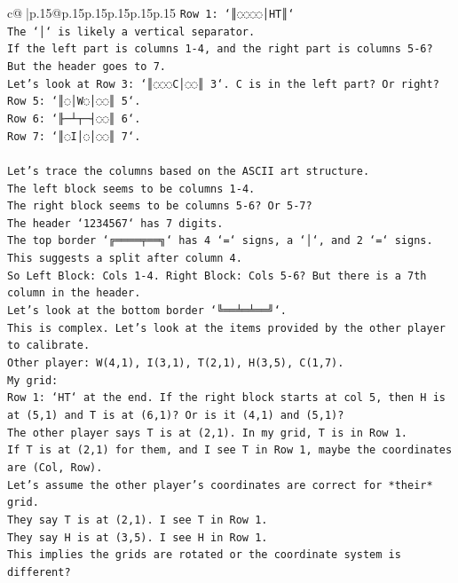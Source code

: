\documentclass{article}
\begin{document}
{\begin{supertabular}{c@{$\;$}|p{.15\linewidth}@{}p{.15\linewidth}p{.15\linewidth}p{.15\linewidth}p{.15\linewidth}p{.15\linewidth}}
{{{\texttt{Row 1: `║◌◌◌◌│HT║`} \\
\texttt{The `│` is likely a vertical separator.} \\
\texttt{If the left part is columns 1{-}4, and the right part is columns 5{-}6?} \\
\texttt{But the header goes to 7.} \\
\texttt{Let's look at Row 3: `║◌◌◌C│◌◌║ 3`. C is in the left part? Or right?} \\
\texttt{Row 5: `║◌│W◌│◌◌║ 5`.} \\
\texttt{Row 6: `╟─┴┬─┤◌◌║ 6`.} \\
\texttt{Row 7: `║◌I│◌│◌◌║ 7`.} \\
\\ 
\texttt{Let's trace the columns based on the ASCII art structure.} \\
\texttt{The left block seems to be columns 1{-}4.} \\
\texttt{The right block seems to be columns 5{-}6? Or 5{-}7?} \\
\texttt{The header `1234567` has 7 digits.} \\
\texttt{The top border `╔════╤══╗` has 4 `=` signs, a `│`, and 2 `=` signs. This suggests a split after column 4.} \\
\texttt{So Left Block: Cols 1{-}4. Right Block: Cols 5{-}6? But there is a 7th column in the header.} \\
\texttt{Let's look at the bottom border `╚══╧═╧══╝`.} \\
\texttt{This is complex. Let's look at the items provided by the other player to calibrate.} \\
\texttt{Other player: W(4,1), I(3,1), T(2,1), H(3,5), C(1,7).} \\
\texttt{My grid:} \\
\texttt{Row 1: `HT` at the end. If the right block starts at col 5, then H is at (5,1) and T is at (6,1)? Or is it (4,1) and (5,1)?} \\
\texttt{The other player says T is at (2,1). In my grid, T is in Row 1.} \\
\texttt{If T is at (2,1) for them, and I see T in Row 1, maybe the coordinates are (Col, Row).} \\
\texttt{Let's assume the other player's coordinates are correct for *their* grid.} \\
\texttt{They say T is at (2,1). I see T in Row 1.} \\
\texttt{They say H is at (3,5). I see H in Row 1.} \\
\texttt{This implies the grids are rotated or the coordinate system is different?} \\
}}}
\end{supertabular}}
\end{document}
